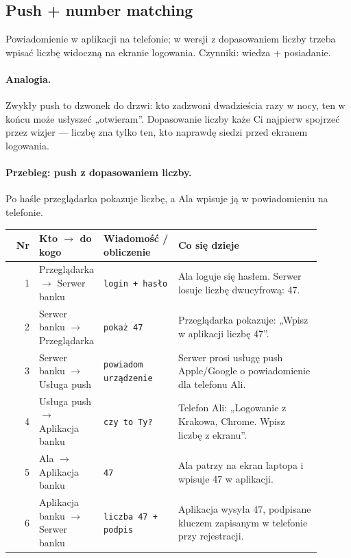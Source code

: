 \subsection{Push + number matching}
\label{sec:mech-push}
Powiadomienie w aplikacji na telefonie; w wersji z dopasowaniem liczby trzeba wpisać liczbę widoczną na ekranie logowania. Czynniki: wiedza + posiadanie. \cite{N1,A2,X5,X9,P7,P10,N4}

\paragraph{Analogia.} Zwykły push to dzwonek do drzwi: kto zadzwoni dwadzieścia razy w nocy, ten w końcu może usłyszeć „otwieram”. Dopasowanie liczby każe Ci najpierw spojrzeć przez wizjer — liczbę zna tylko ten, kto naprawdę siedzi przed ekranem logowania.

\paragraph{Przebieg: push z dopasowaniem liczby.} Po haśle przeglądarka pokazuje liczbę, a Ala wpisuje ją w powiadomieniu na telefonie.
\begingroup\footnotesize
\begin{longtable}{@{}r p{0.2\linewidth} p{0.24\linewidth} p{0.46\linewidth}@{}}
\toprule
Nr & Kto $\rightarrow$ do kogo & Wiadomość / obliczenie & Co się dzieje \\
\midrule
\endhead
1 & Przeglądarka $\rightarrow$ Serwer banku & \texttt{login + hasło} & Ala loguje się hasłem. Serwer losuje liczbę dwucyfrową: 47. \\
2 & Serwer banku $\rightarrow$ Przeglądarka & \texttt{pokaż 47} & Przeglądarka pokazuje: „Wpisz w aplikacji liczbę 47”. \\
3 & Serwer banku $\rightarrow$ Usługa push & \texttt{powiadom urządzenie} & Serwer prosi usługę push Apple/Google o powiadomienie dla telefonu Ali. \\
4 & Usługa push $\rightarrow$ Aplikacja banku & \texttt{czy to Ty?} & Telefon Ali: „Logowanie z Krakowa, Chrome. Wpisz liczbę z ekranu”. \\
5 & Ala $\rightarrow$ Aplikacja banku & \texttt{47} & Ala patrzy na ekran laptopa i wpisuje 47 w aplikacji. \\
6 & Aplikacja banku $\rightarrow$ Serwer banku & \texttt{liczba 47 + podpis} & Aplikacja wysyła 47, podpisane kluczem zapisanym w telefonie przy rejestracji. \\
\bottomrule
\end{longtable}
\endgroup

